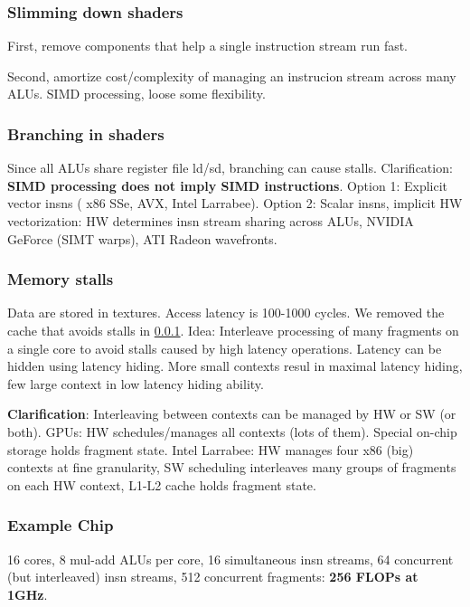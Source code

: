 \documentclass[a4paper, fontsize=8pt, landscape, DIV=1]{scrartcl}
\begin{document}
\begin{multicols*}{4}
  \subsubsection{Slimming down shaders} \label{sec:slimdownshader}
  First, remove components that help a single instruction stream run fast.

  Second, amortize cost/complexity of managing an instrucion stream across many ALUs.
  SIMD processing, loose some flexibility.

  \subsubsection{Branching in shaders}
  Since all ALUs share register file ld/sd, branching can cause stalls. Clarification:
  \textbf{SIMD processing does not imply SIMD instructions}. Option 1: Explicit vector insns (
  x86 SSe, AVX, Intel Larrabee). Option 2: Scalar insns, implicit HW vectorization: HW
  determines insn stream sharing across ALUs, NVIDIA GeForce (SIMT warps), ATI Radeon 
  wavefronts.

  \subsubsection{Memory stalls}
  Data are stored in textures. Access latency is 100-1000 cycles. We removed the cache
  that avoids stalls in \ref{sec:slimdownshader}. Idea: Interleave processing of many
  fragments on a single core to avoid stalls caused by high latency operations.
  Latency can be hidden using latency hiding. More small contexts resul in maximal latency
  hiding, few large context in low latency hiding ability.

  \textbf{Clarification}: Interleaving between contexts can be managed by HW or SW (or both).
  GPUs: HW schedules/manages all contexts (lots of them). Special on-chip storage holds
  fragment state. Intel Larrabee: HW manages four x86 (big) contexts at fine granularity,
  SW scheduling interleaves many groups of fragments on each HW context, L1-L2 cache holds fragment
  state.

  \subsubsection{Example Chip}
  16 cores, 8 mul-add ALUs per core, 16 simultaneous insn streams, 64 concurrent (but
  interleaved) insn streams, 512 concurrent fragments: \textbf{256 FLOPs at 1GHz}.


\end{multicols*}
\end{document}
